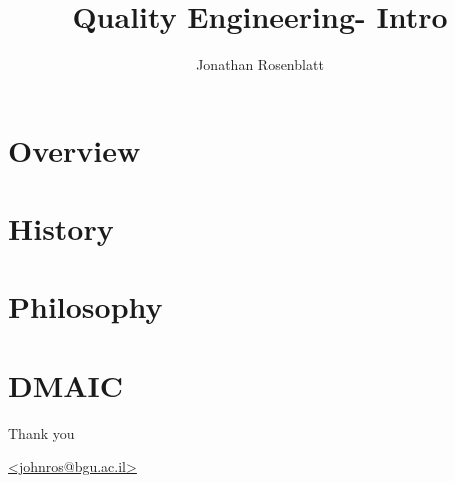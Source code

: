 \documentclass[12pt, mathserif,c]{beamer}
\author[J.R.]{Jonathan Rosenblatt}
\title[Quality Engineering]{Quality Engineering- Intro}
\institute[BGU]{Ben Gurion University of the Negev}
\date{}
\begin{document}
\begin{frame}
\titlepage
\end{frame}

\begin{frame}
\tableofcontents
\end{frame}





\section{Overview}
\frame{\insertsection}




\section{History}
\begin{frame}
 
\end{frame}


\section{Philosophy}



\section{DMAIC}


\begin{frame}

Thank you 

\url{<johnros@bgu.ac.il>}
\end{frame}










\end{document}
